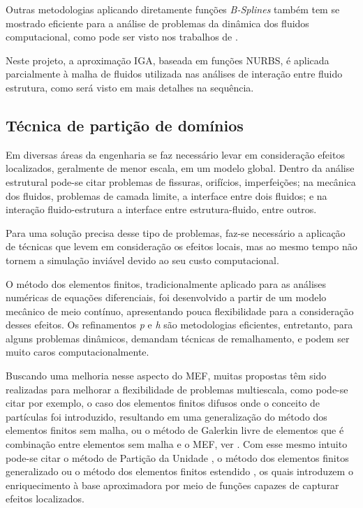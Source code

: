 \documentclass[tese_patricia.tex]{subfiles}
\begin{document}
Outras metodologias aplicando diretamente funções \textit{B-Splines} também tem se mostrado eficiente para a análise de problemas da dinâmica dos fluidos computacional, como pode ser visto nos trabalhos de .

Neste projeto, a aproximação IGA, baseada em funções NURBS, é aplicada parcialmente à malha de fluidos utilizada nas análises de interação entre fluido estrutura, como será visto em mais detalhes na sequência.


 
\subsection{Técnica de partição de domínios}
\label{arlequinsection}

Em diversas áreas da engenharia se faz necessário levar em consideração efeitos localizados, geralmente de menor escala, em um modelo global. Dentro da análise estrutural pode-se citar problemas de fissuras, orifícios, imperfeições; na mecânica dos fluidos, problemas de camada limite, a interface entre dois fluidos; e na interação fluido-estrutura a interface entre estrutura-fluido, entre outros.

Para uma solução precisa desse tipo de problemas, faz-se necessário a aplicação de técnicas que levem em consideração os efeitos locais, mas ao mesmo tempo não tornem a simulação inviável devido ao seu custo computacional.

O método dos elementos finitos, tradicionalmente aplicado para as análises numéricas de equações diferenciais, foi desenvolvido a partir de um modelo mecânico de meio contínuo, apresentando pouca flexibilidade para a consideração desses efeitos. Os refinamentos \textit{p} e \textit{h} são metodologias eficientes, entretanto, para alguns problemas dinâmicos, demandam técnicas de remalhamento, e podem ser muito caros computacionalmente.

Buscando uma melhoria nesse aspecto do MEF, muitas propostas têm sido realizadas para melhorar a flexibilidade de problemas multiescala, como pode-se citar por exemplo, o caso dos elementos finitos difusos \cite{NayrolesTV:1992} onde o conceito de partículas foi introduzido, resultando em uma generalização do método dos elementos finitos sem malha, ou o método de Galerkin livre de elementos que é combinação entre elementos sem malha e o MEF, ver . Com esse mesmo intuito pode-se citar o método de Partição da Unidade \cite{MelenkB:1996}, o método dos elementos finitos generalizado \cite{StrouboulisCB:2001} ou o método dos elementos finitos estendido \cite{FarhatHF:2001}, os quais introduzem o enriquecimento à base aproximadora por meio de funções capazes de capturar efeitos localizados.
\end{document}
